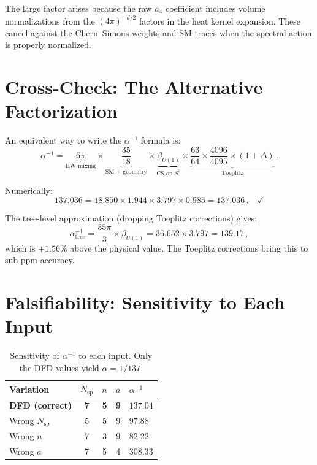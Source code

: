 \documentclass[12pt,a4paper]{article}
\theoremstyle{definition}
\begin{document}
The large factor arises because the raw $a_4$ coefficient includes
volume normalizations from the $(4\pi)^{-d/2}$ factors in the heat
kernel expansion.  These cancel against the Chern--Simons weights and
SM traces when the spectral action is properly normalized.

\section{Cross-Check: The Alternative Factorization}
\label{sec:cross-check}

An equivalent way to write the $\alpha^{-1}$ formula is:
\begin{equation}
\alpha^{-1} = \underbrace{6\pi}_{\text{EW mixing}}
\times \underbrace{\frac{35}{18}}_{\text{SM + geometry}}
\times \underbrace{\beta_{U(1)}}_{\text{CS on }S^3}
\times \underbrace{\frac{63}{64} \times \frac{4096}{4095}
\times (1+\Delta)}_{\text{Toeplitz}}\,.
\end{equation}

Numerically:
\begin{equation}
137.036 = 18.850 \times 1.944 \times 3.797 \times 0.985 = 137.036\,.
\quad\checkmark
\end{equation}

The tree-level approximation (dropping Toeplitz corrections) gives:
\begin{equation}
\alpha^{-1}_{\mathrm{tree}} = \frac{35\pi}{3} \times \beta_{U(1)}
= 36.652 \times 3.797 = 139.17\,,
\end{equation}
which is $+1.56\%$ above the physical value.  The Toeplitz corrections
bring this to sub-ppm accuracy.

\section{Falsifiability: Sensitivity to Each Input}
\label{sec:falsify}

\begin{table}[h]
\centering
\caption{Sensitivity of $\alpha^{-1}$ to each input.  Only the DFD
values yield $\alpha = 1/137$.}
\label{tab:sensitivity}
\renewcommand{\arraystretch}{1.3}
\begin{tabular}{lcccl}
\toprule
Variation & $N_{\mathrm{sp}}$ & $n$ & $a$ & $\alpha^{-1}$ \\
\midrule
\textbf{DFD (correct)} & \textbf{7} & \textbf{5} & \textbf{9}
  & $\mathbf{137.04}$ \\
Wrong $N_{\mathrm{sp}}$ & 5 & 5 & 9 & $97.88$ \\
Wrong $n$ & 7 & 3 & 9 & $82.22$ \\
Wrong $a$ & 7 & 5 & 4 & $308.33$ \\
\bottomrule
\end{tabular}
\end{table}
\end{document}
